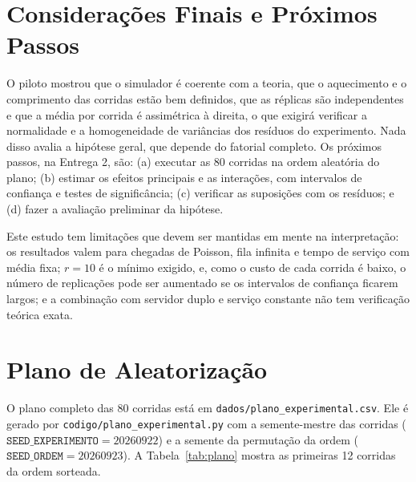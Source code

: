 \documentclass[stu,a4paper,12pt,floatsintext,biblatex]{apa7}
\begin{document}
\section{Considerações Finais e Próximos Passos}
O piloto mostrou que o simulador é coerente com a teoria, que o aquecimento e o comprimento das corridas estão bem definidos, que as réplicas são independentes e que a média por corrida é assimétrica à direita, o que exigirá verificar a normalidade e a homogeneidade de variâncias dos resíduos do experimento.
Nada disso avalia a hipótese geral, que depende do fatorial completo.
Os próximos passos, na Entrega 2, são: (a) executar as 80 corridas na ordem aleatória do plano; (b) estimar os efeitos principais e as interações, com intervalos de confiança e testes de significância; (c) verificar as suposições com os resíduos; e (d) fazer a avaliação preliminar da hipótese.

Este estudo tem limitações que devem ser mantidas em mente na interpretação: os resultados valem para chegadas de Poisson, fila infinita e tempo de serviço com média fixa; $r = 10$ é o mínimo exigido, e, como o custo de cada corrida é baixo, o número de replicações pode ser aumentado se os intervalos de confiança ficarem largos; e a combinação com servidor duplo e serviço constante não tem verificação teórica exata.

\printbibliography[title={Referências}]

\appendix
\section{Plano de Aleatorização}
O plano completo das 80 corridas está em \texttt{dados/plano\_experimental.csv}.
Ele é gerado por \texttt{codigo/plano\_experimental.py} com a semente-mestre das corridas ($\texttt{SEED\_EXPERIMENTO} = 20260922$) e a semente da permutação da ordem ($\texttt{SEED\_ORDEM} = 20260923$).
A Tabela~\ref{tab:plano} mostra as primeiras 12 corridas da ordem sorteada.

\begin{table}[H]
\caption{Primeiras corridas da ordem de execução aleatorizada}
\label{tab:plano}
\small

\end{table}
\end{document}
